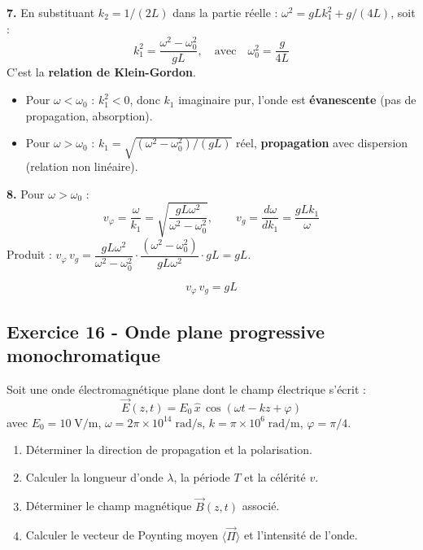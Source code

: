 \documentclass[12pt,a4paper]{article}
\begin{document}
\begin{boitecorrige}
\textbf{7.} En substituant $k_2 = 1/(2L)$ dans la partie réelle : $\omega^2 = gLk_1^2 + g/(4L)$, soit :
\[
k_1^2 = \frac{\omega^2 - \omega_0^2}{gL}, \quad\text{avec}\quad \omega_0^2 = \frac{g}{4L}
\]
C'est la \textbf{relation de Klein-Gordon}.
\begin{itemize}
  \item Pour $\omega < \omega_0$ : $k_1^2 < 0$, donc $k_1$ imaginaire pur, l'onde est \textbf{évanescente} (pas de propagation, absorption).
  \item Pour $\omega > \omega_0$ : $k_1 = \sqrt{(\omega^2-\omega_0^2)/(gL)}$ réel, \textbf{propagation} avec dispersion (relation non linéaire).
\end{itemize}

\textbf{8.} Pour $\omega > \omega_0$ :
\[
v_\varphi = \frac{\omega}{k_1} = \sqrt{\frac{gL\omega^2}{\omega^2-\omega_0^2}}, \qquad v_g = \frac{d\omega}{dk_1} = \frac{gLk_1}{\omega}
\]
Produit : $v_\varphi\,v_g = \dfrac{gL\omega^2}{\omega^2-\omega_0^2}\cdot\dfrac{(\omega^2-\omega_0^2)}{gL\omega^2}\cdot gL = gL$.

\[
\boxed{v_\varphi\, v_g = gL}
\]
\end{boitecorrige}

\subsection*{Exercice 16 - Onde plane progressive monochromatique \niveau{\facile}}

\begin{boiteexercice}
Soit une onde électromagnétique plane dont le champ électrique s'écrit :
\[
\vec{E}(z,t) = E_0\,\hat{x}\,\cos(\omega t - kz + \varphi)
\]
avec $E_0 = 10\;\text{V/m}$, $\omega = 2\pi\times 10^{14}\;\text{rad/s}$, $k = \pi\times10^6\;\text{rad/m}$, $\varphi = \pi/4$.
\begin{enumerate}
  \item Déterminer la direction de propagation et la polarisation.
  \item Calculer la longueur d'onde $\lambda$, la période $T$ et la célérité $v$.
  \item Déterminer le champ magnétique $\vec{B}(z,t)$ associé.
  \item Calculer le vecteur de Poynting moyen $\langle\vec{\Pi}\rangle$ et l'intensité de l'onde.
\end{enumerate}
\end{boiteexercice}
\end{document}

